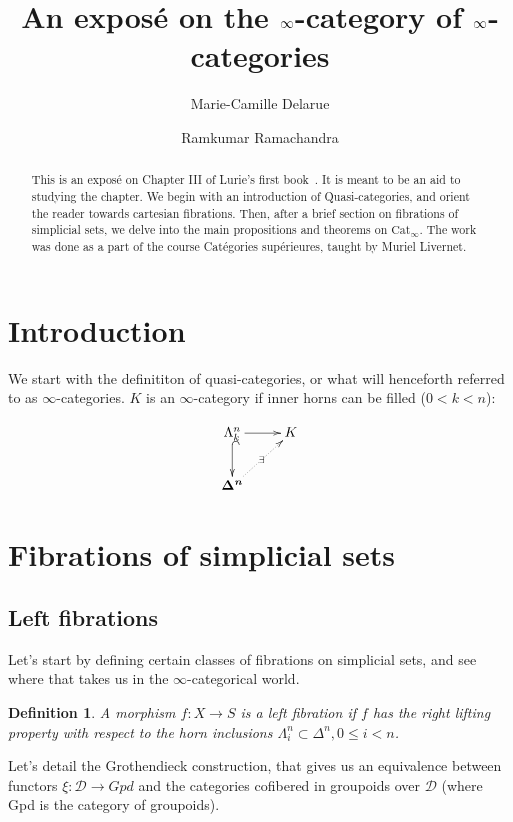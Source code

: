 \documentclass[a4paper, 12pt]{amsart}
\title{An exposé on the $\8$-category of $\8$-categories}
\author{Marie-Camille Delarue}
\author{Ramkumar Ramachandra}
\newcommand{\8}{\infty}
\newcommand{\Horn}[2]{\Lambda^{#1}_{#2}}
\newcommand{\Simplex}[1]{\boldsymbol{\Delta^{#1}}}
\newtheorem{definition}{Definition}
\begin{document}
\begin{abstract}
  This is an exposé on Chapter III of Lurie's first book~\cite{lurie09}. It is meant to be an aid to studying the chapter. We begin with an introduction of Quasi-categories, and orient the reader towards cartesian fibrations. Then, after a brief section on fibrations of simplicial sets, we delve into the main propositions and theorems on $\text{Cat}_\8$. The work was done as a part of the course Catégories supérieures, taught by Muriel Livernet.
\end{abstract}
\maketitle
\tableofcontents

\section{Introduction}

We start with the definititon of quasi-categories, or what will henceforth referred to as $\8$-categories. $K$ is an $\8$-category if inner horns can be filled ($0 < k < n$):

$$
  \begin{xy}
    \xymatrix{
      \Horn{n}{k}\ar[r]\ar@{^{(}->}[d] & K \\
      \Simplex{n}\ar@{.>}[ur]|\exists &
    }
  \end{xy}
$$

\section{Fibrations of simplicial sets}

\subsection{Left fibrations}
Let's start by defining certain classes of fibrations on simplicial sets, and see where that takes us in the $\8$-categorical world.

\begin{definition}
  A morphism $f:X\rightarrow S$ is a left fibration if $f$ has the right lifting property with respect to the horn inclusions $\Lambda_i^n\subset \Delta^n, 0\leq i < n$.
\end{definition}

Let's detail the Grothendieck construction, that gives us an equivalence between functors $\xi:\mathcal{D}\rightarrow Gpd$ and the categories cofibered in groupoids over $\mathcal{D}$ (where Gpd is the category of groupoids).
\end{document}
